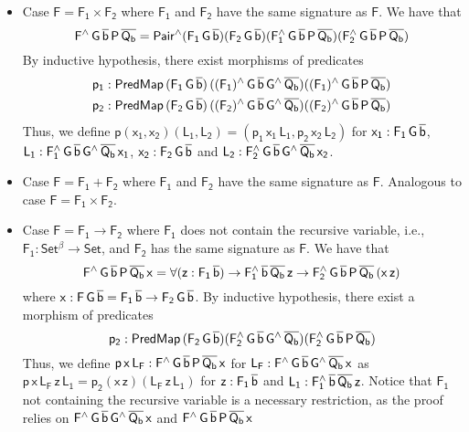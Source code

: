 \documentclass[9pt]{entcs} \usepackage{entcsmacro}
\begin{document}
\begin{itemize}
\item Case $\mathsf{F = F_1 \times F_2}$ where $\mathsf{F_1}$ and $\mathsf{F_2}$ have the same signature as $\mathsf{F}$.
We have that
\[
\mathsf{F^{\wedge}\,G\,\overline{b}\,P\,\overline{Q_b}
= Pair^{\wedge}(F_1\,G\,\overline{b})(F_2\,G\,\overline{b})(F_1^{\wedge}\,G\,\overline{b}\,P\,\overline{Q_b}) (F_2^{\wedge}\,G\,\overline{b}\,P\,\overline{Q_b})}
\]
By inductive hypothesis, there exist morphisms of predicates
\begin{gather*}
\mathsf{p_1 : PredMap\,(F_1\,G\,\overline{b})\,((F_1)^{\wedge}\,G\,\overline{b}\,G^{\wedge}\,\overline{Q_b}) ((F_1)^{\wedge}\,G\,\overline{b}\,P\,\overline{Q_b})} \\
\mathsf{p_2 : PredMap\,(F_2\,G\,\overline{b})\,((F_2)^{\wedge}\,G\,\overline{b}\,G^{\wedge}\,\overline{Q_b}) ((F_2)^{\wedge}\,G\,\overline{b}\,P\,\overline{Q_b})}
\end{gather*}
Thus, we define $\mathsf{p (x_1, x_2) (L_1, L_2) = (p_1\,x_1\,L_1, p_2\,x_2\,L_2)}$ 
for 
$\mathsf{x_1 : F_1\,G\,\overline{b}}$,
$\mathsf{L_1 : F_1^{\wedge}\,G\,\overline{b}\,G^{\wedge}\,\overline{Q_b}\,x_1}$,
$\mathsf{x_2 : F_2\,G\,\overline{b}}$
and $\mathsf{L_2 : F_2^{\wedge}\,G\,\overline{b}\,G^{\wedge}\,\overline{Q_b}\,x_2}$.
\item Case $\mathsf{F = F_1 + F_2}$ where $\mathsf{F_1}$ and $\mathsf{F_2}$ have the same signature as $\mathsf{F}$.
Analogous to case $\mathsf{F = F_1 \times F_2}$.
\item Case $\mathsf{F = F_1 \to F_2}$
where $\mathsf{F_1}$ does not contain the recursive variable,
i.e., $\mathsf{F_1 : Set^\beta \to Set}$,
and $\mathsf{F_2}$ has the same signature as $\mathsf{F}$.
We have that
\[
\mathsf{F^{\wedge}\,G\,\overline{b}\,P\,\overline{Q_b}\,x = \forall (z : F_1\,\overline{b}) \to F_1^{\wedge}\,\overline{b}\,\overline{Q_b}\,z \to F_2^{\wedge}\,G\,\overline{b}\,P\,\overline{Q_b}\,(x\,z)}
\]
where $\mathsf{x : F\,G\,\overline{b} = F_1\,\overline{b} \to F_2\,G\,\overline{b}}$.
By inductive hypothesis, there exist a morphism of predicates
\[
\mathsf{p_2 : PredMap\,(F_2\,G\,\overline{b}) (F_2^{\wedge}\,G\,\overline{b}\,G^{\wedge}\,\overline{Q_b}) (F_2^{\wedge}\,G\,\overline{b}\,P\,\overline{Q_b})}
\]
Thus, we define $\mathsf{p\,x\,L_F : F^{\wedge}\,G\,\overline{b}\,P\,\overline{Q_b}\,x}$
for $\mathsf{L_F : F^{\wedge}\,G\,\overline{b}\,G^{\wedge}\,\overline{Q_b}\,x}$
as $\mathsf{p\,x\,L_F\,z\,L_1 = p_2 (x\,z) (L_F\,z\,L_1)}$
for $\mathsf{z : F_1\,\overline{b}}$
and $\mathsf{L_1 : F_1^{\wedge}\,\overline{b}\,\overline{Q_b}\,z}$.
Notice that $\mathsf{F_1}$ not containing the recursive variable
is a necessary restriction, as the proof relies on
$\mathsf{F^{\wedge}\,G\,\overline{b}\,G^{\wedge}\,\overline{Q_b}\,x}$
and $\mathsf{F^{\wedge}\,G\,\overline{b}\,P\,\overline{Q_b}\,x}$

\end{itemize}
\end{document}
